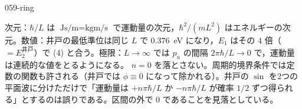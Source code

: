 \documentclass[uplatex,dvipdfmx,a4paper,11pt]{jsarticle}
\begin{document}
\begin{kaisetsu}{059-ring}
\begin{ronten}
\end{ronten}
\kenzan 次元：$\hbar/L$ は $\unit{\joule\second\per\metre}=\unit{\kilogram\metre\per\second}$ で運動量の次元，$\hbar^{2}/(mL^{2})$ はエネルギーの次元。数値：井戸の最低準位は同じ $L$ で \qty{0.376}{\electronvolt} になり，$E_{1}$ はその $4$ 倍（$=E_{2}^{\text{井戸}}$）で (4) と合う。極限：$L\to\infty$ では $p_{n}$ の間隔 $2\pi\hbar/L\to0$ で，運動量は連続的な値をとるようになる。
\tsumazuki $n=0$ を落とさない。周期的境界条件では定数の関数も許される（井戸では $\phi\equiv0$ になって除かれる）。井戸の $\sin$ を2つの平面波に分けただけで「運動量は $+n\pi\hbar/L$ か $-n\pi\hbar/L$ が確率 $1/2$ ずつ得られる」とするのは誤りである。区間の外で $0$ であることを見落としている。
\end{kaisetsu}
\end{document}

